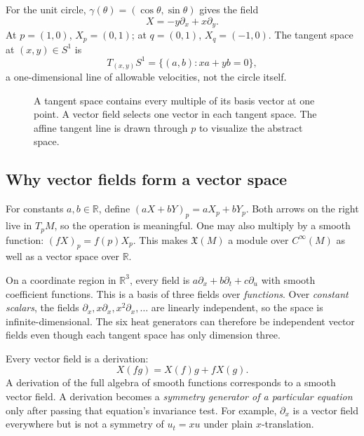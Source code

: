 \documentclass[11pt,a4paper]{article}
\numberwithin{equation}{section}
\theoremstyle{definition}
\theoremstyle{plain}
\theoremstyle{remark}
\newcommand{\R}{\mathbb R}
\begin{document}
For the unit circle, $\gamma(\theta)=(\cos\theta,\sin\theta)$ gives the field
\[
X=-y\partial_x+x\partial_y.
\]
At $p=(1,0)$, $X_p=(0,1)$; at $q=(0,1)$, $X_q=(-1,0)$. The tangent space at $(x,y)\in S^1$ is
\[
T_{(x,y)}S^1=\{(a,b):xa+yb=0\},
\]
a one-dimensional line of allowable velocities, not the circle itself.

\begin{figure}[htbp]\centering
{}
\caption{A tangent space contains every multiple of its basis vector at one point. A vector field selects one vector in each tangent space. The affine tangent line is drawn through $p$ to visualize the abstract space.}
\end{figure}

\subsection{Why vector fields form a vector space}
For constants $a,b\in\R$, define $(aX+bY)_p=aX_p+bY_p$. Both arrows on the right live in $T_pM$, so the operation is meaningful. One may also multiply by a smooth function: $(fX)_p=f(p)X_p$. This makes $\mathfrak X(M)$ a module over $C^\infty(M)$ as well as a vector space over $\R$.

On a coordinate region in $\R^3$, every field is $a\partial_x+b\partial_t+c\partial_u$ with smooth coefficient functions. This is a basis of three fields over \emph{functions}. Over \emph{constant scalars}, the fields $\partial_x,x\partial_x,x^2\partial_x,\ldots$ are linearly independent, so the space is infinite-dimensional. The six heat generators can therefore be independent vector fields even though each tangent space has only dimension three.

Every vector field is a derivation:
\[
X(fg)=X(f)g+fX(g).
\]
A derivation of the full algebra of smooth functions corresponds to a smooth vector field. A derivation becomes a \emph{symmetry generator of a particular equation} only after passing that equation's invariance test. For example, $\partial_x$ is a vector field everywhere but is not a symmetry of $u_t=xu$ under plain $x$-translation.
\end{document}
